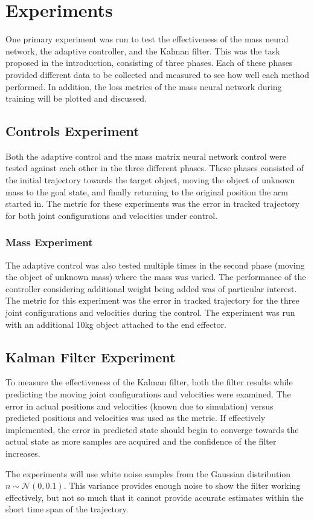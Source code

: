 \section{Experiments}
One primary experiment was run to test the effectiveness of the mass neural network, the adaptive controller, and the Kalman filter.
This was the task proposed in the introduction, consisting of three phases.
Each of these phases provided different data to be collected and measured to see how well each method performed.
In addition, the loss metrics of the mass neural network during training will be plotted and discussed.

\subsection*{Controls Experiment}
Both the adaptive control and the mass matrix neural network control were tested against each other in the three different phases.
These phases consisted of the initial trajectory towards the target object, moving the object of unknown mass to the goal state, and finally returning to the original position the arm started in.
The metric for these experiments was the error in tracked trajectory for both joint configurations and velocities under control.

\subsubsection*{Mass Experiment}
The adaptive control was also tested multiple times in the second phase (moving the object of unknown mass) where the mass was varied.
The performance of the controller considering additional weight being added was of particular interest.
The metric for this experiment was the error in tracked trajectory for the three joint configurations and velocities during the control.
The experiment was run with an additional 10kg object attached to the end effector.

\subsection*{Kalman Filter Experiment}
To measure the effectiveness of the Kalman filter, both the filter results while predicting the moving joint configurations and velocities were examined.
The error in actual positions and velocities (known due to simulation) versus predicted positions and velocities was used as the metric.
If effectively implemented, the error in predicted state should begin to converge towards the actual state as more samples are acquired and the confidence of the filter increases.

The experiments will use white noise samples from the Gaussian distribution $n\sim \mathcal{N}(0,0.1)$.
This variance provides enough noise to show the filter working effectively, but not so much that it cannot provide accurate estimates within the short time span of the trajectory.


